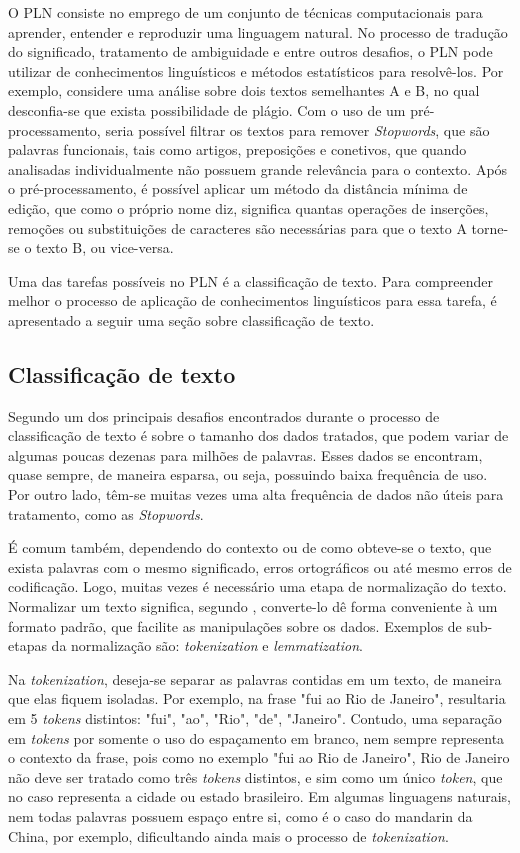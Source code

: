 O PLN consiste no emprego de um conjunto de técnicas computacionais para aprender, entender e reproduzir uma linguagem natural. No processo de tradução do significado, tratamento de ambiguidade e entre outros desafios, o PLN pode utilizar de conhecimentos linguísticos e métodos estatísticos para resolvê-los. Por exemplo, considere uma análise sobre dois textos semelhantes A e B, no qual desconfia-se que exista possibilidade de plágio. Com o uso de um pré-processamento, seria possível filtrar os textos para remover \textit{Stopwords}, que são palavras funcionais, tais como artigos, preposições e conetivos, que quando analisadas individualmente não possuem grande relevância para o contexto. Após o pré-processamento, é possível aplicar um método da distância mínima de edição, que como o próprio nome diz, significa quantas operações de inserções, remoções ou substituições de caracteres são necessárias para que o texto A torne-se o texto B, ou vice-versa. 

Uma das tarefas possíveis no PLN é a classificação de texto. Para compreender melhor o processo de aplicação de conhecimentos linguísticos para essa tarefa, é apresentado a seguir uma seção sobre classificação de texto.

\subsection{Classificação de texto}
Segundo \cite{aggarwal2014data} um dos principais desafios encontrados durante o processo de classificação de texto é sobre o tamanho dos dados tratados, que podem variar de algumas poucas dezenas para milhões de palavras. Esses dados se encontram, quase sempre, de maneira esparsa, ou seja, possuindo baixa frequência de uso. Por outro lado, têm-se muitas vezes uma alta frequência de dados não úteis para tratamento, como as \textit{Stopwords}.

É comum também, dependendo do contexto ou de como obteve-se o texto, que exista palavras com o mesmo significado, erros ortográficos ou até mesmo erros de codificação. Logo, muitas vezes é necessário uma etapa de normalização do texto. Normalizar um texto significa, segundo \citep{martin2018speech}, converte-lo dê forma conveniente à um formato padrão, que facilite as manipulações sobre os dados. Exemplos de sub-etapas da normalização são: \textit{tokenization} e \textit{lemmatization}. 

Na \textit{tokenization}, deseja-se separar as palavras contidas em um texto, de maneira que elas fiquem isoladas. Por exemplo, na frase "fui ao Rio de Janeiro", resultaria em 5 \textit{tokens} distintos: "fui", "ao", "Rio", "de", "Janeiro". Contudo, uma separação em \textit{tokens} por somente o uso do espaçamento em branco, nem sempre representa o contexto da frase, pois como no exemplo "fui ao Rio de Janeiro", Rio de Janeiro não deve ser tratado como três \textit{tokens} distintos, e sim como um único \textit{token}, que no caso representa a cidade ou estado brasileiro. Em algumas linguagens naturais, nem todas palavras possuem espaço entre si, como é o caso do mandarin da China, por exemplo, dificultando ainda mais o processo de \textit{tokenization}. 

